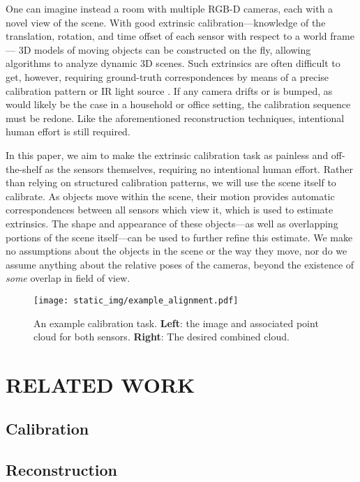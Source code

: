 \documentclass[letterpaper, 10 pt, conference]{ieeeconf}  %
\begin{document}
One can imagine instead a room with multiple RGB-D cameras, each with a novel view of the scene. With good 
extrinsic calibration---knowledge of the translation, rotation, and time offset of each sensor with respect to a world frame---
3D models of moving objects can be constructed on the fly, allowing algorithms to analyze dynamic 3D scenes. Such extrinsics 
are often difficult to get, however, requiring ground-truth correspondences by means of a precise calibration pattern 
\cite{checkerboard} or IR light source \cite{IRlight}. If any camera drifts or is bumped, as would likely be the case in 
a household or office setting, the calibration sequence must be redone. Like the aforementioned reconstruction techniques, 
intentional human effort is still required.

In this paper, we aim to make the extrinsic calibration task as painless and off-the-shelf as the sensors themselves, 
requiring no intentional human effort. Rather than relying on structured calibration patterns, 
we will use the scene itself to calibrate. As objects move within the scene, their motion provides automatic
correspondences between all sensors which view it, which is used to estimate extrinsics. 
The shape and appearance of these objects---as well as overlapping portions of the scene itself---can be used to further 
refine this estimate. We make no assumptions about the objects in the scene or the way they move, nor do we assume anything 
about the relative poses of the cameras, beyond the existence of \emph{some} overlap in field of view.


\begin{figure*}
  \centering
  \texttt{[image: static\_img/example\_alignment.pdf]}
  \caption{An example calibration task. \textbf{Left}: the image and associated point cloud for both sensors. \textbf{Right}: The desired combined cloud.}
  \label{fig:example_alignment}
\end{figure*}

\section{RELATED WORK}
\subsection{Calibration}

\subsection{Reconstruction}
\end{document}
